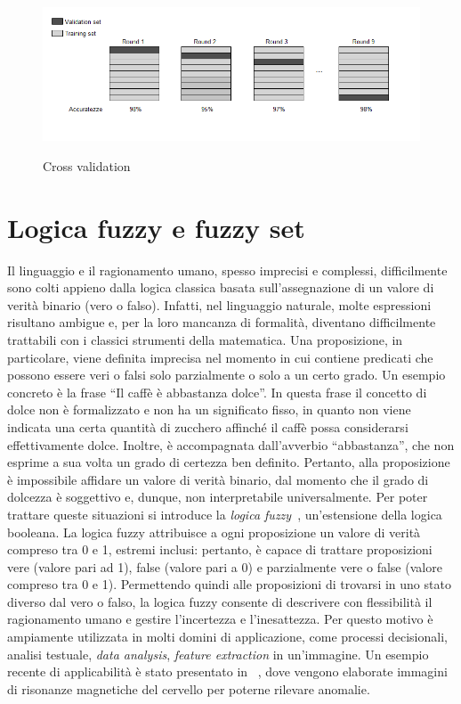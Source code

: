 \documentclass[11pt,  oneside, openany]{book}
\begin{document}
\begin{figure}[h!]
\begin{center}
  \includegraphics[width=13cm]{Immagini/Crossvalidation.png}\\
  \caption{Cross validation}
\end{center}
\end{figure}

	\section{Logica fuzzy e fuzzy set}
Il linguaggio e il ragionamento umano, spesso imprecisi e complessi, difficilmente sono colti appieno dalla logica classica basata sull'assegnazione di un valore di verità binario (vero o falso). Infatti, nel linguaggio naturale, molte espressioni risultano ambigue e, per la loro mancanza di formalità, diventano difficilmente trattabili con i classici strumenti della matematica. Una proposizione, in particolare, viene definita imprecisa nel momento in cui contiene predicati che possono essere veri o falsi solo parzialmente o solo a un certo grado. Un esempio concreto è la frase ``Il caffè è abbastanza dolce''. In questa frase il concetto di dolce non è formalizzato e non ha un significato fisso, in quanto non viene indicata una certa quantità di zucchero affinché il caffè possa considerarsi effettivamente dolce. Inoltre, è accompagnata dall'avverbio ``abbastanza'', che non esprime a sua volta un grado di certezza ben definito. Pertanto, alla proposizione è impossibile affidare un valore di verità binario, dal momento che il grado di dolcezza è soggettivo e, dunque, non interpretabile universalmente. Per poter trattare queste situazioni si introduce la \textit{logica fuzzy}~\cite{fuzzylogicintro}, un'estensione della logica booleana. La logica fuzzy attribuisce a ogni proposizione un valore di verità compreso tra 0 e 1, estremi inclusi: pertanto, è capace di trattare proposizioni vere (valore pari ad 1), false (valore pari a 0) e parzialmente vere o false (valore compreso tra 0 e 1). Permettendo quindi alle proposizioni di trovarsi in uno stato diverso dal vero o falso, la logica fuzzy consente di descrivere con flessibilità il ragionamento umano e gestire l'incertezza e l'inesattezza. Per questo motivo è ampiamente utilizzata in molti domini di applicazione, come processi decisionali, analisi testuale, \textit{data analysis}, \textit{feature extraction} in un'immagine. Un esempio recente di applicabilità è stato presentato in ~\cite{fuzzybraintumor}, dove vengono elaborate immagini di risonanze magnetiche del cervello per poterne rilevare anomalie. 
\end{document}
